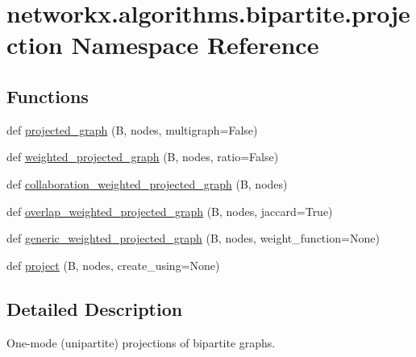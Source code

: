 \hypertarget{namespacenetworkx_1_1algorithms_1_1bipartite_1_1projection}{}\section{networkx.\+algorithms.\+bipartite.\+projection Namespace Reference}
\label{namespacenetworkx_1_1algorithms_1_1bipartite_1_1projection}
\subsection*{Functions}
\begin{DoxyCompactItemize}
\item 
def \hyperlink{namespacenetworkx_1_1algorithms_1_1bipartite_1_1projection_a25fdb8f9485964086be0bd888ce2e889}{projected\+\_\+graph} (B, nodes, multigraph=False)
\item 
def \hyperlink{namespacenetworkx_1_1algorithms_1_1bipartite_1_1projection_a935d7b42123102da40dfab3abf214964}{weighted\+\_\+projected\+\_\+graph} (B, nodes, ratio=False)
\item 
def \hyperlink{namespacenetworkx_1_1algorithms_1_1bipartite_1_1projection_a85bf33978fff5e964ef3f5ab4b900c9b}{collaboration\+\_\+weighted\+\_\+projected\+\_\+graph} (B, nodes)
\item 
def \hyperlink{namespacenetworkx_1_1algorithms_1_1bipartite_1_1projection_a721a560d62d5e95a8d7409975e2c964a}{overlap\+\_\+weighted\+\_\+projected\+\_\+graph} (B, nodes, jaccard=True)
\item 
def \hyperlink{namespacenetworkx_1_1algorithms_1_1bipartite_1_1projection_acb316130921b3c729892efde7fe0f747}{generic\+\_\+weighted\+\_\+projected\+\_\+graph} (B, nodes, weight\+\_\+function=None)
\item 
def \hyperlink{namespacenetworkx_1_1algorithms_1_1bipartite_1_1projection_aaabf2d1a051d388c83a9b663b9daea87}{project} (B, nodes, create\+\_\+using=None)
\end{DoxyCompactItemize}


\subsection{Detailed Description}
\begin{DoxyVerb}One-mode (unipartite) projections of bipartite graphs.\end{DoxyVerb}
 


